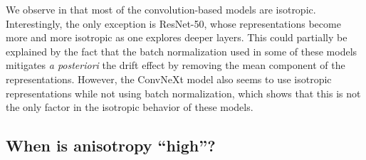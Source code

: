 We observe in  that most of the convolution-based models are isotropic. Interestingly, the only exception is ResNet-50, whose representations become more and more isotropic as one explores deeper layers. This could partially be explained by the fact that the batch normalization \citep{pmlr-v37-ioffe15} used in some of these models mitigates \textit{a posteriori} the drift effect by removing the mean component of the representations. However, the ConvNeXt model also seems to use isotropic representations while not using batch normalization, which shows that this is not the only factor in the isotropic behavior of these models.

\subsection{When is anisotropy ``high''?}

